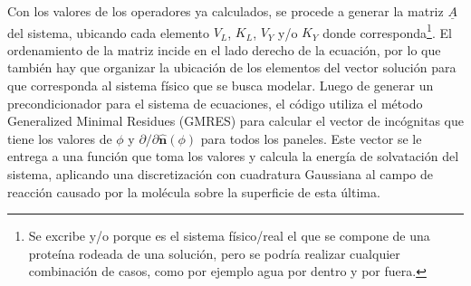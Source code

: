 \documentclass[12pt, oneside, numbers, spanish]{ezthesis}
\numberwithin{equation}{section}
\begin{document}
Con los valores de los operadores ya calculados, se procede a generar la matriz $\underline{A}$ del sistema, ubicando cada elemento $V_L$, $K_L$, $V_Y$ y/o $K_Y$ donde corresponda\footnote{Se excribe y/o porque es el sistema físico/real el que se compone de una proteína rodeada de una solución, pero se podría realizar cualquier combinación de casos, como por ejemplo agua por dentro y por fuera.}. El ordenamiento de la matriz incide en el lado derecho de la ecuación, por lo que también hay que organizar la ubicación de los elementos del vector solución para que corresponda al sistema físico que se busca modelar. Luego de generar un precondicionador para el sistema de ecuaciones, el código utiliza el método Generalized Minimal Residues (GMRES) para calcular el vector de incógnitas que tiene los valores de $\phi$ y $\partial/\partial\hat{\mathbf{n}}(\phi)$ para todos los paneles. Este vector se le entrega a una función que toma los valores y calcula la energía de solvatación del sistema, aplicando una discretización con cuadratura Gaussiana al campo de reacción causado por la molécula sobre la superficie de esta última. 

\end{document}
